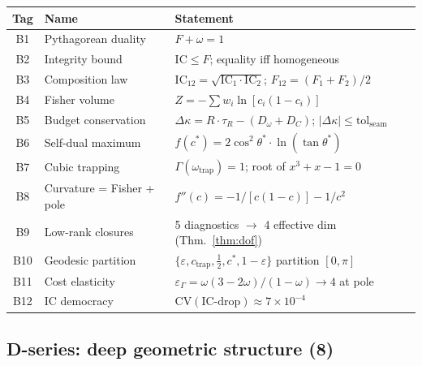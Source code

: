 \documentclass[
  aps,
  prd,
  twocolumn,
  superscriptaddress,
  nofootinbib,
  floatfix
]{revtex4-2}
\newcommand{\tR}{\tau_{\!R}}
\newcommand{\Gam}{\Gamma}
\newcommand{\eps}{\varepsilon}
\newcommand{\tolseam}{\mathrm{tol}_{\mathrm{seam}}}
\newcommand{\IC}{\mathrm{IC}}
\begin{document}
{\small
\begin{center}
\begin{tabular}{@{}clP{3.5cm}@{}}
\toprule
Tag & Name & Statement \\
\midrule
B1 & Pythagorean duality &
  $F + \omega = 1$ \\
B2 & Integrity bound &
  $\IC \leq F$; equality iff homogeneous \\
B3 & Composition law &
  $\IC_{12} = \sqrt{\IC_1 \cdot \IC_2}$;
  $F_{12} = (F_1{+}F_2)/2$ \\
B4 & Fisher volume &
  $Z = -\sum w_i \ln[c_i(1{-}c_i)]$ \\
B5 & Budget conservation &
  $\Delta\kappa = R \cdot \tR - (D_\omega{+}D_C)$;
  $|\Delta\kappa| \leq \tolseam$ \\
B6 & Self-dual maximum &
  $f(c^*) = 2\cos^2\theta^* \cdot \ln(\tan\theta^*)$ \\
B7 & Cubic trapping &
  $\Gam(\omega_\mathrm{trap}) = 1$; root of
  $x^3{+}x{-}1 = 0$ \\
B8 & Curvature = Fisher + pole &
  $f''(c) = -1/[c(1{-}c)] - 1/c^2$ \\
B9 & Low-rank closures &
  5 diagnostics $\to$ 4 effective dim
  (Thm.~\ref{thm:dof}) \\
B10 & Geodesic partition &
  $\{\eps, c_\mathrm{trap}, \tfrac{1}{2}, c^*, 1{-}\eps\}$
  partition $[0,\pi]$ \\
B11 & Cost elasticity &
  $\varepsilon_\Gam = \omega(3{-}2\omega)/(1{-}\omega)
  \to 4$ at pole \\
B12 & IC democracy &
  $\mathrm{CV}(\text{IC-drop}) \approx 7 \times 10^{-4}$ \\
\bottomrule
\end{tabular}
\end{center}}

\subsection{D-series: deep geometric structure (8)}
\end{document}
